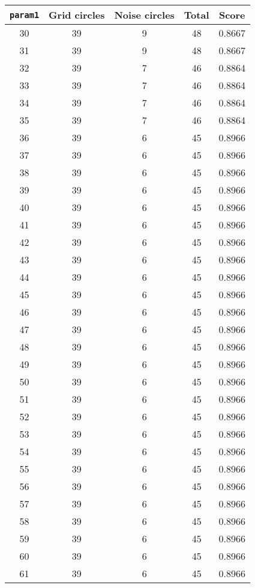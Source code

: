 \documentclass[letterpaper, 12pt]{article}
\begin{document}
\begin{longtable}{|c|c|c|c|c|}
\hline
\textbf{\texttt{param1}} & \textbf{Grid circles} & \textbf{Noise circles} & \textbf{Total} & \textbf{Score} \\
\hline
30 & 39 & 9 & 48 & 0.8667 \\
\hline
31 & 39 & 9 & 48 & 0.8667 \\
\hline
32 & 39 & 7 & 46 & 0.8864 \\
\hline
33 & 39 & 7 & 46 & 0.8864 \\
\hline
34 & 39 & 7 & 46 & 0.8864 \\
\hline
35 & 39 & 7 & 46 & 0.8864 \\
\hline
36 & 39 & 6 & 45 & 0.8966 \\
\hline
37 & 39 & 6 & 45 & 0.8966 \\
\hline
38 & 39 & 6 & 45 & 0.8966 \\
\hline
39 & 39 & 6 & 45 & 0.8966 \\
\hline
40 & 39 & 6 & 45 & 0.8966 \\
\hline
41 & 39 & 6 & 45 & 0.8966 \\
\hline
42 & 39 & 6 & 45 & 0.8966 \\
\hline
43 & 39 & 6 & 45 & 0.8966 \\
\hline
44 & 39 & 6 & 45 & 0.8966 \\
\hline
45 & 39 & 6 & 45 & 0.8966 \\
\hline
46 & 39 & 6 & 45 & 0.8966 \\
\hline
47 & 39 & 6 & 45 & 0.8966 \\
\hline
48 & 39 & 6 & 45 & 0.8966 \\
\hline
49 & 39 & 6 & 45 & 0.8966 \\
\hline
50 & 39 & 6 & 45 & 0.8966 \\
\hline
51 & 39 & 6 & 45 & 0.8966 \\
\hline
52 & 39 & 6 & 45 & 0.8966 \\
\hline
53 & 39 & 6 & 45 & 0.8966 \\
\hline
54 & 39 & 6 & 45 & 0.8966 \\
\hline
55 & 39 & 6 & 45 & 0.8966 \\
\hline
56 & 39 & 6 & 45 & 0.8966 \\
\hline
57 & 39 & 6 & 45 & 0.8966 \\
\hline
58 & 39 & 6 & 45 & 0.8966 \\
\hline
59 & 39 & 6 & 45 & 0.8966 \\
\hline
60 & 39 & 6 & 45 & 0.8966 \\
\hline
61 & 39 & 6 & 45 & 0.8966 \\

\end{longtable}
\end{document}
